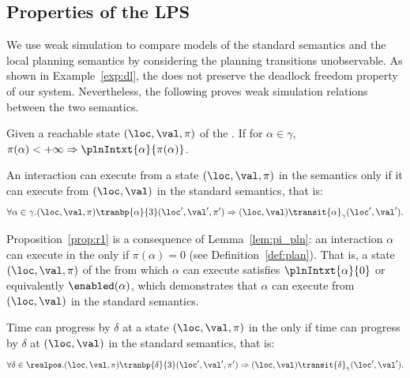 \subsection{Properties of the LPS}\label{subsec:planprop}
We use weak simulation to compare models of
the standard semantics and the local planning semantics
by considering the planning transitions unobservable.
As shown in Example~\ref{exp:dl}, the \lpsabrb does not preserve the deadlock freedom 
property of our system.
Nevertheless, the following proves weak simulation relations between the two semantics.

\begin{lemma}\label{lem:pi_pln}
  Given a reachable state $(\loc,\val,\pi)$ of the \lpsabr. If for $\alpha\in\gamma$, 
  $\pi(\alpha) < +\infty \Rightarrow \plnIntxt{\alpha}{\pi(\alpha)}$.
\end{lemma}


\begin{proposition}\label{prop:r1}
An interaction can execute from a state $(\loc,\val,\pi)$ in the \lpsabrb semantics only if 
it can execute from $(\loc,\val)$ in the standard semantics, that is:
\begin{displaymath}
      \forall\alpha\in\gamma.(\loc,\val,\pi)\tranbp{\alpha}{3}(\loc',\val',\pi')
      \Rightarrow (\loc,\val)\transit{\alpha}_{\gamma}(\loc',\val').
\end{displaymath}
\end{proposition}

Proposition~\ref{prop:r1} is a consequence of Lemma~\ref{lem:pi_pln}: an interaction $\alpha$ 
can execute in the \lps only if $\pi(\alpha) = 0$ (see Definition~\ref{def:plan}).
That is, a state $(\loc,\val,\pi)$ of the \lpsabrb from which $\alpha$ can execute satisfies 
$\plnIntxt{\alpha}{0}$ or equivalently $\enabled(\alpha)$, which demonstrates that $\alpha$ 
can execute from $(\loc,\val)$ in the standard semantics.

\begin{proposition}\label{prop:r2}
Time can progress by $\delta$ at a state $(\loc,\val,\pi)$ in the \lps only if time can 
progress by $\delta$ at $(\loc,\val)$ in the standard semantics, that is:
\begin{displaymath}
      \forall\delta\in\realpos.(\loc,\val,\pi)\tranbp{\delta}{3}(\loc',\val',\pi')
      \Rightarrow (\loc,\val)\transit{\delta}_{\gamma}(\loc',\val').
\end{displaymath}
\end{proposition}

